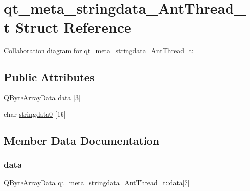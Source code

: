 \hypertarget{structqt__meta__stringdata__AntThread__t}{}\section{qt\+\_\+meta\+\_\+stringdata\+\_\+\+Ant\+Thread\+\_\+t Struct Reference}
\label{structqt__meta__stringdata__AntThread__t}


Collaboration diagram for qt\+\_\+meta\+\_\+stringdata\+\_\+\+Ant\+Thread\+\_\+t\+:
\subsection*{Public Attributes}
\begin{DoxyCompactItemize}
\item 
Q\+Byte\+Array\+Data \hyperlink{structqt__meta__stringdata__AntThread__t_a1e973b6722f2782cadd5b511b31c29b7}{data} \mbox{[}3\mbox{]}
\item 
char \hyperlink{structqt__meta__stringdata__AntThread__t_a011b956025a2cde048a6d1f9e00d4753}{stringdata0} \mbox{[}16\mbox{]}
\end{DoxyCompactItemize}


\subsection{Member Data Documentation}
\mbox{\label{structqt__meta__stringdata__AntThread__t_a1e973b6722f2782cadd5b511b31c29b7}} 
\subsubsection{\texorpdfstring{data}{data}}
{\footnotesize\ttfamily Q\+Byte\+Array\+Data qt\+\_\+meta\+\_\+stringdata\+\_\+\+Ant\+Thread\+\_\+t\+::data\mbox{[}3\mbox{]}}

\mbox{\label{structqt__meta__stringdata__AntThread__t_a011b956025a2cde048a6d1f9e00d4753}} 
